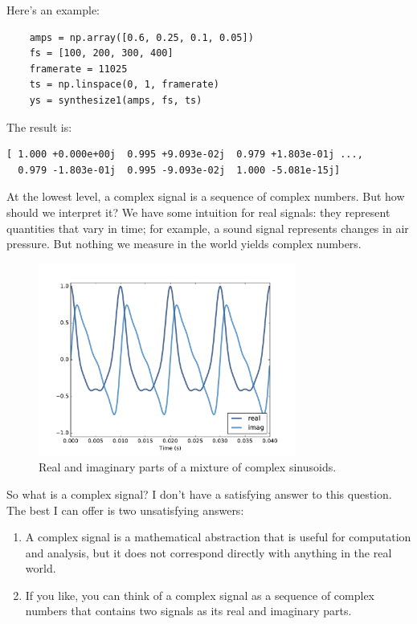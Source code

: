 \documentclass[12pt]{book}
\begin{document}
Here's an example:

\begin{verbatim}
    amps = np.array([0.6, 0.25, 0.1, 0.05])
    fs = [100, 200, 300, 400]
    framerate = 11025
    ts = np.linspace(0, 1, framerate)
    ys = synthesize1(amps, fs, ts)
\end{verbatim}

The result is:

\begin{verbatim}
[ 1.000 +0.000e+00j  0.995 +9.093e-02j  0.979 +1.803e-01j ...,
  0.979 -1.803e-01j  0.995 -9.093e-02j  1.000 -5.081e-15j]
\end{verbatim}

At the lowest level, a complex signal is a sequence of complex
numbers.  But how should we interpret it?  We have some intuition for
real signals: they represent quantities that vary in time; for
example, a sound signal represents changes in air pressure.
But nothing we measure in the world yields complex numbers.

\begin{figure}
\centerline{\includegraphics[height=2.5in]{figs/dft1.pdf}}
\caption{Real and imaginary parts of a mixture of complex sinusoids.}
\label{fig.dft1}
\end{figure}

So what is a complex signal?  I don't have a satisfying answer to this
question.  The best I can offer is two unsatisfying
answers:

\begin{enumerate}

\item A complex signal is a mathematical abstraction that is useful
  for computation and analysis, but it does not correspond directly
  with anything in the real world.

\item If you like, you can think of a complex signal as a sequence of
  complex numbers that contains two signals as its real and imaginary
  parts.

\end{enumerate}
\end{document}
